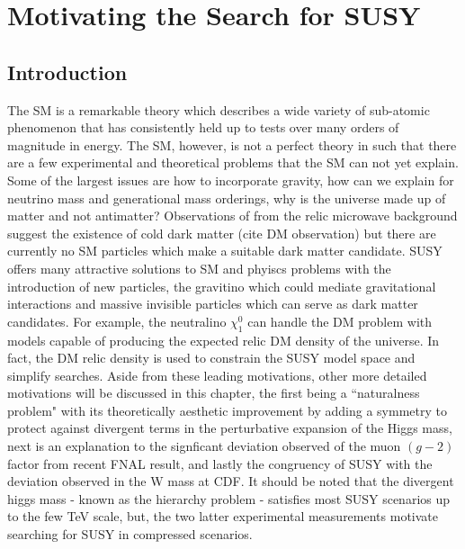 
\setcounter{secnumdepth}{3}
\setcounter{tocdepth}{3}

\setlength{\parindent}{1 em}


\makeatother


\chapter{Motivating the Search for SUSY}


\section{Introduction}

The SM is a remarkable theory which describes a wide variety of sub-atomic phenomenon that has consistently held up to tests over many orders of magnitude in energy. The SM, however, is not a perfect theory in such that there are a few  experimental and theoretical problems that the SM can not yet explain. Some of the largest  issues are how to incorporate gravity,  how can we explain for neutrino mass and generational mass orderings, why is the universe made up of matter and not antimatter?   Observations of from the relic microwave background suggest the existence of cold dark matter (cite DM observation) but there are currently no SM particles which make a suitable dark matter candidate. SUSY offers many attractive solutions to SM and phyiscs problems with the introduction of new particles, the gravitino which could mediate gravitational interactions and  massive invisible particles which can serve as dark matter candidates. For example, the neutralino $\chi_1^0$ can handle the DM problem with models capable of producing the expected relic DM density of the universe. In fact, the DM relic density is used to constrain the SUSY model space and simplify searches. Aside from these leading motivations, other more detailed motivations will be discussed in this chapter, the first being a ``naturalness problem" with its theoretically aesthetic improvement by adding a symmetry to protect against divergent terms in the perturbative expansion of the Higgs mass, next is an explanation to the signficant deviation observed of the muon $(g-2)$ factor from recent FNAL result, and lastly the congruency of SUSY with the deviation observed in the W mass at CDF. It should be noted that the divergent higgs mass - known as the hierarchy problem - satisfies most SUSY scenarios up to the few TeV scale, but, the two latter experimental measurements motivate searching for SUSY in compressed scenarios.



